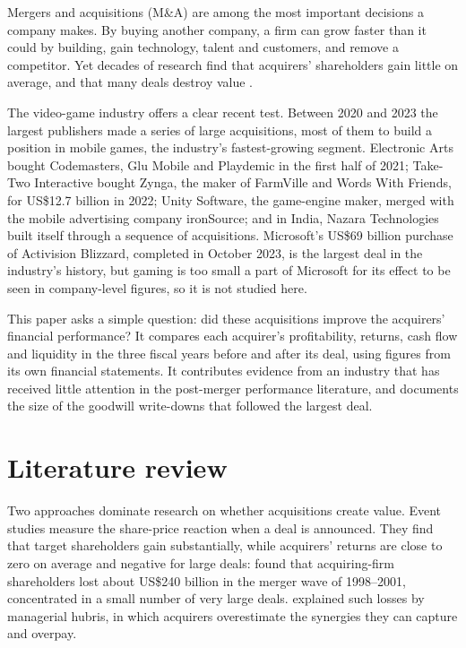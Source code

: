 \documentclass[sn-basic]{sn-jnl}
\newcommand{\USD}{US\$}
\begin{document}
Mergers and acquisitions (M\&A) are among the most important decisions a company makes. By buying another company, a firm can grow faster than it could by building, gain technology, talent and customers, and remove a competitor. Yet decades of research find that acquirers' shareholders gain little on average, and that many deals destroy value \citep{andrade2001,moeller2005}.

The video-game industry offers a clear recent test. Between 2020 and 2023 the largest publishers made a series of large acquisitions, most of them to build a position in mobile games, the industry's fastest-growing segment. Electronic Arts bought Codemasters, Glu Mobile and Playdemic in the first half of 2021; Take-Two Interactive bought Zynga, the maker of FarmVille and Words With Friends, for \USD 12.7 billion in 2022; Unity Software, the game-engine maker, merged with the mobile advertising company ironSource; and in India, Nazara Technologies built itself through a sequence of acquisitions. Microsoft's \USD 69 billion purchase of Activision Blizzard, completed in October 2023, is the largest deal in the industry's history, but gaming is too small a part of Microsoft for its effect to be seen in company-level figures, so it is not studied here.

This paper asks a simple question: did these acquisitions improve the acquirers' financial performance? It compares each acquirer's profitability, returns, cash flow and liquidity in the three fiscal years before and after its deal, using figures from its own financial statements. It contributes evidence from an industry that has received little attention in the post-merger performance literature, and documents the size of the goodwill write-downs that followed the largest deal.

\section{Literature review}\label{sec:lit}

Two approaches dominate research on whether acquisitions create value. Event studies measure the share-price reaction when a deal is announced. They find that target shareholders gain substantially, while acquirers' returns are close to zero on average and negative for large deals: \citet{moeller2005} found that acquiring-firm shareholders lost about \USD 240 billion in the merger wave of 1998--2001, concentrated in a small number of very large deals. \citet{roll1986} explained such losses by managerial hubris, in which acquirers overestimate the synergies they can capture and overpay.
\end{document}
